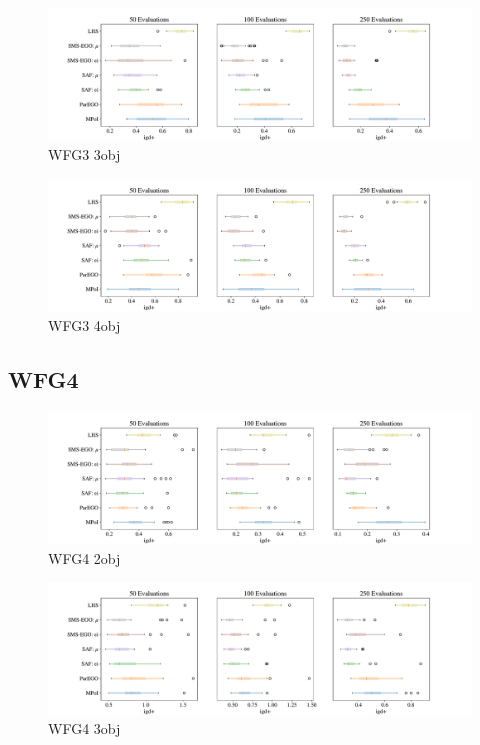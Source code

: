 \documentclass[
dvipsnames, table,   %
format=acmsmall,     %
anonymous=true,      %
authorversion=false, %
]{acmart}
\begin{document}
\begin{figure}[h]
    \centering
    \includegraphics[width=\textwidth]{figures/wfg3_3obj_10dim_igd_boxplot.pdf}
    \caption{WFG3 3obj}
    \label{fig:boxplot WFG3_3obj_10dim}
\end{figure}

\begin{figure}[h]
    \centering
    \includegraphics[width=\textwidth]{figures/wfg3_4obj_10dim_2_igd_boxplot.pdf}
    \caption{WFG3 4obj}
    \label{fig:boxplot WFG3_4obj_10dim}
\end{figure}
\clearpage

\subsection{WFG4}
\begin{figure}[h]
    \centering
    \includegraphics[width=\textwidth]{figures/wfg4_2obj_6dim_igd_boxplot.pdf}
    \caption{WFG4 2obj}
    \label{fig:boxplot WFG4_2obj_6dim}
\end{figure}

\begin{figure}[h]
    \centering
    \includegraphics[width=\textwidth]{figures/wfg4_3obj_8dim_igd_boxplot.pdf}
    \caption{WFG4 3obj}
    \label{fig:boxplot WFG4_3obj_8dim}
\end{figure}
\end{document}
